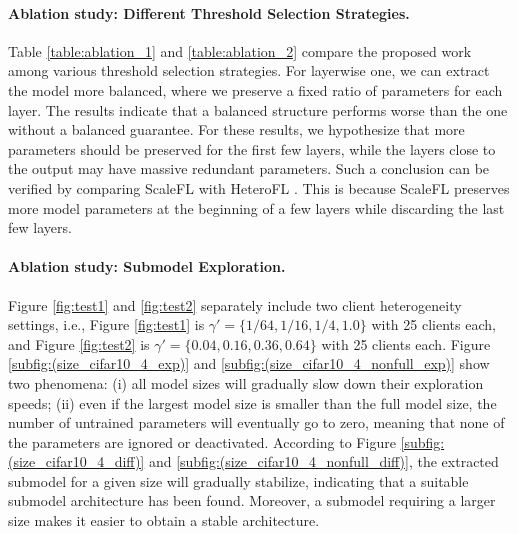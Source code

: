 \documentclass{article}
\renewcommand{\cite}{\citep}
\theoremstyle{plain}
\theoremstyle{definition}
\theoremstyle{remark}
\begin{document}
\paragraph{Ablation study: Different Threshold Selection Strategies.}
Table \ref{table:ablation_1} and \ref{table:ablation_2} compare the proposed work among various threshold selection strategies. For layerwise one, we can extract the model more balanced, where we preserve a fixed ratio of parameters for each layer. The results indicate that a balanced structure performs worse than the one without a balanced guarantee. For these results, we hypothesize that more parameters should be preserved for the first few layers, while the layers close to the output may have massive redundant parameters. Such a conclusion can be verified by comparing ScaleFL \cite{ilhan2023scalefl} with HeteroFL \cite{diao2020heterofl}. This is because ScaleFL preserves more model parameters at the beginning of a few layers while discarding the last few layers. 



\paragraph{Ablation study: Submodel Exploration.} 
Figure \ref{fig:test1} and \ref{fig:test2} separately include two client heterogeneity settings, i.e., Figure \ref{fig:test1} is $\gamma' = \{1/64, 1/16, 1/4, 1.0\}$ with 25 clients each, and Figure \ref{fig:test2} is $\gamma' = \{0.04, 0.16, 0.36, 0.64\}$ with 25 clients each. Figure \ref{subfig:(size_cifar10_4_exp)} and \ref{subfig:(size_cifar10_4_nonfull_exp)} show two phenomena: (i) all model sizes will gradually slow down their exploration speeds; (ii) even if the largest model size is smaller than the full model size, the number of untrained parameters will eventually go to zero, meaning that none of the parameters are ignored or deactivated. According to Figure \ref{subfig:(size_cifar10_4_diff)} and \ref{subfig:(size_cifar10_4_nonfull_diff)}, the extracted submodel for a given size will gradually stabilize, indicating that a suitable submodel architecture has been found. Moreover, a submodel requiring a larger size makes it easier to obtain a stable architecture.
\end{document}
